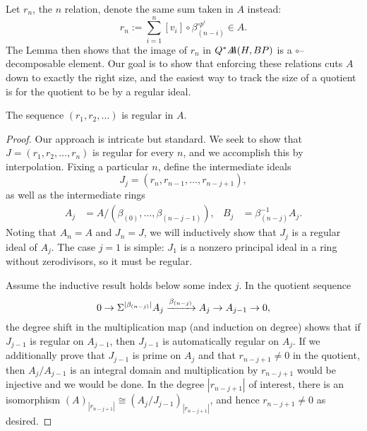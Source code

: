 Let $r_n$, the $n${\th} relation, denote the same sum taken in $A$ instead: \[r_n := \sum_{i=1}^n [v_i] \circ \beta_{(n-i)}^{\circ p^i} \in A.\]  The Lemma then shows that the image of $r_n$ in $Q^* \AA(H, BP)$ is a $\circ$--decomposable element.  Our goal is to show that enforcing these relations cuts $A$ down to exactly the right size, and the easiest way to track the size of a quotient is for the quotient to be by a regular ideal.

\begin{lemma}
The sequence $(r_1, r_2, \ldots)$ is regular in $A$.
\end{lemma}
\begin{proof}
Our approach is intricate but standard.  We seek to show that $J = (r_1, r_2, \ldots, r_n)$ is regular for every $n$, and we accomplish this by interpolation.  Fixing a particular $n$, define the intermediate ideals \[J_j = (r_n, r_{n-1}, \ldots, r_{n-j+1}),\] as well as the intermediate rings
\begin{align*}
A_j & = A / (\beta_{(0)}, \ldots, \beta_{(n-j-1)}), &
B_j & = \beta_{(n-j)}^{-1} A_j.
\end{align*}
Noting that $A_n = A$ and $J_n = J$, we will inductively show that $J_j$ is a regular ideal of $A_j$.  The case $j = 1$ is simple: $J_1$ is a nonzero principal ideal in a ring without zerodivisors, so it must be regular.

Assume the inductive result holds below some index $j$.  In the quotient sequence \[0 \to \Susp^{|\beta_{(n-j)}|} A_j \xrightarrow{\beta_{(n-j)}} A_j \to A_{j-1} \to 0,\] the degree shift in the multiplication map (and induction on degree) shows that if $J_{j-1}$ is regular on $A_{j-1}$, then $J_{j-1}$ is automatically regular on $A_j$.  If we additionally prove that $J_{j-1}$ is prime on $A_j$ and that $r_{n-j+1} \ne 0$ in the quotient, then $A_j / A_{j-1}$ is an integral domain and multiplication by $r_{n-j+1}$ would be injective and we would be done.  In the degree $|r_{n-j+1}|$ of interest, there is an isomorphism $(A)_{|r_{n-j+1}|} \cong (A_j / J_{j-1})_{|r_{n-j+1}|}$, and hence $r_{n-j+1} \ne 0$ as desired.


\end{proof}
